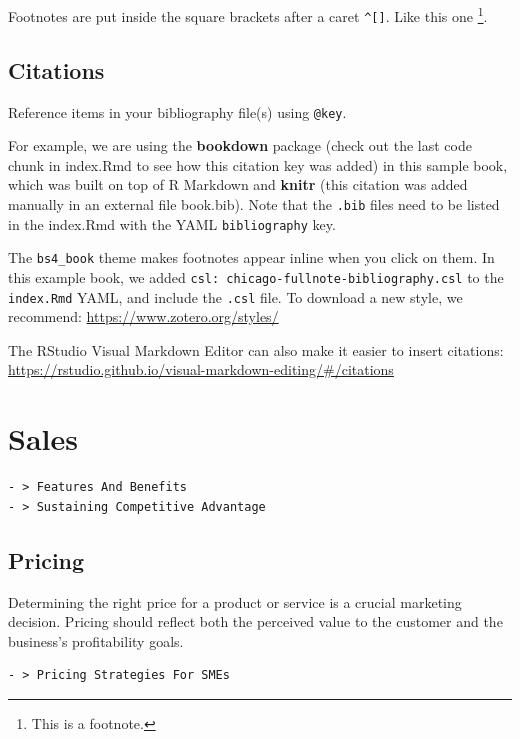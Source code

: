 \documentclass[
]{book}
\begin{document}
Footnotes are put inside the square brackets after a caret \texttt{\^{}{[}{]}}. Like this one \footnote{This is a footnote.}.

\hypertarget{citations}{%
\section{Citations}\label{citations}}

Reference items in your bibliography file(s) using \texttt{@key}.

For example, we are using the \textbf{bookdown} package \citep{R-bookdown} (check out the last code chunk in index.Rmd to see how this citation key was added) in this sample book, which was built on top of R Markdown and \textbf{knitr} \citep{xie2015} (this citation was added manually in an external file book.bib).
Note that the \texttt{.bib} files need to be listed in the index.Rmd with the YAML \texttt{bibliography} key.

The \texttt{bs4\_book} theme makes footnotes appear inline when you click on them. In this example book, we added \texttt{csl:\ chicago-fullnote-bibliography.csl} to the \texttt{index.Rmd} YAML, and include the \texttt{.csl} file. To download a new style, we recommend: \url{https://www.zotero.org/styles/}

The RStudio Visual Markdown Editor can also make it easier to insert citations: \url{https://rstudio.github.io/visual-markdown-editing/\#/citations}

\hypertarget{sales-1}{%
\chapter{Sales}\label{sales-1}}

\begin{verbatim}
- > Features And Benefits
- > Sustaining Competitive Advantage
\end{verbatim}

\hypertarget{pricing}{%
\section{Pricing}\label{pricing}}

Determining the right price for a product or service is a crucial marketing decision. Pricing should reflect both the perceived value to the customer and the business's profitability goals.

\begin{verbatim}
- > Pricing Strategies For SMEs
\end{verbatim}
\end{document}

